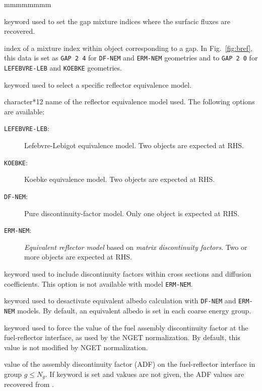 \begin{ListeDeDescription}{mmmmmmmm}
\item[\moc{GAP}] keyword used to set the gap mixture indices  where the surfacic fluxes are recovered.

\item[\dusa{igap}] index of a mixture index within object  corresponding to a gap. In Fig.~\ref{fig:bref}, this data
is set as {\tt GAP 2 4} for {\tt DF-NEM} and {\tt ERM-NEM} geometries and to {\tt GAP 2 0} for {\tt LEFEBVRE-LEB} and {\tt KOEBKE}
geometries.

\item[\moc{MODE}] keyword used to select a specific reflector equivalence model.

\item[\dusa{hmod}] character*12 name of the reflector equivalence model used. The following options are available:
\begin{description}
\item[{\tt LEFEBVRE-LEB}:] Lefebvre-Lebigot equivalence model. Two  objects are expected at RHS.\cite{LLB,Frohlicher}
\item[{\tt KOEBKE}:] Koebke equivalence model. Two  objects are expected at RHS.\cite{Koebke,Frohlicher}
\item[{\tt DF-NEM}:] Pure discontinuity-factor model. Only one  object is expected at RHS.
\item[{\tt ERM-NEM}:] {\sl Equivalent reflector model} based on {\sl matrix discontinuity factors}.  Two or more  objects are expected at RHS.
\end{description}

\item[\moc{SPH}] keyword used to include discontinuity factors within cross sections and diffusion coefficients. This option is not available
with model {\tt ERM-NEM}.

\item[\moc{NOAL}] keyword used to desactivate equivalent albedo calculation with {\tt DF-NEM} and {\tt ERM-NEM} models. By default, an equivalent
albedo is set in each coarse energy group.

\item[\moc{NGET}] keyword used to force the value of the fuel assembly discontinuity factor at the fuel-reflector interface, as used
by the NGET normalization. By default, this value is not modified by NGET normalization.

\item[\dusa{adf}] value of the assembly discontinuity factor (ADF) on the fuel-reflector interface in group $g\le N_g$. If keyword  is set and
 vakues are not given, the ADF values are recovered from .

\end{ListeDeDescription}

\eject
